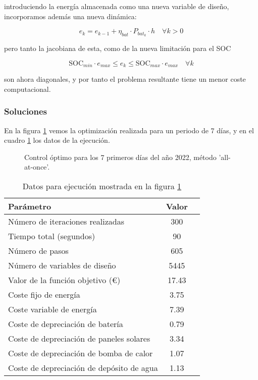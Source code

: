 introduciendo la energía almacenada como una nueva variable de diseño, incorporamos
además una nueva dinámica:

\begin{equation}
	e_k = e_{k-1} + \eta_{bat} \cdot P_{bat_k} \cdot h \quad \forall k > 0
\end{equation}

pero tanto la jacobiana de esta, como de la nueva limitación para el SOC

\begin{equation}
	\text{SOC}_{min} \cdot e_{max} \leq e_k \leq \text{SOC}_{max} \cdot e_{max} \quad \forall k
\end{equation}

son ahora diagonales, y por tanto el problema resultante tiene un menor coste
computacional.

\subsubsection{Soluciones}

En la figura \ref{fig:control_sand_7_days} vemos la optimización realizada para
un periodo de 7 días, y en el cuadro \ref{tab:control_sand_7_days} los
datos de la ejecución.

\begin{figure}[h] \centering
	\centering
	
	\caption{Control óptimo para los 7 primeros días del año 2022, método 'all-at-once'.}
	\label{fig:control_sand_7_days}
\end{figure}

\begin{table}[ht]
	\centering
	\caption{Datos para ejecución mostrada en la figura \ref{fig:control_sand_7_days}}
	\label{tab:control_sand_7_days}
	\begin{tabular}{@{}lcc@{}}
		\toprule
		Parámetro                                 & Valor \\
		\midrule
		Número de iteraciones realizadas          & 300   \\
		Tiempo total (segundos)                   & 90    \\
		Número de pasos                           & 605   \\
		Número de variables de diseño             & 5445  \\
		\midrule
		Valor de la función objetivo (€)          & 17.43 \\
		\midrule
		Coste fijo de energía                     & 3.75  \\
		Coste variable de energía                 & 7.39  \\
		Coste de depreciación de batería          & 0.79  \\
		Coste de depreciación de paneles solares  & 3.34  \\
		Coste de depreciación de bomba de calor   & 1.07  \\
		Coste de depreciación de depósito de agua & 1.13  \\
		\bottomrule
	\end{tabular}
\end{table}


